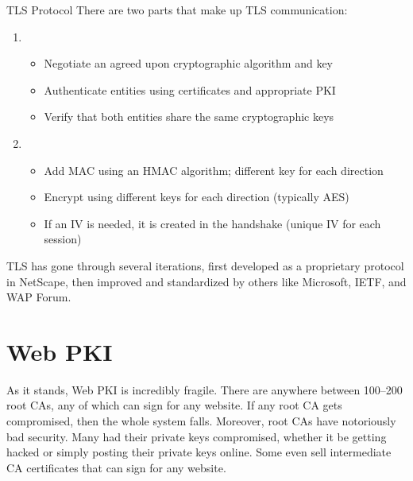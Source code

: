 \begin{tecbox}{TLS Protocol}{}
    There are two parts that make up TLS communication:
    \begin{enumerate}
        \item {}
        \begin{itemize}[noitemsep]
            \item Negotiate an agreed upon cryptographic algorithm and key
            \item Authenticate entities using certificates and appropriate PKI
            \item Verify that both entities share the same cryptographic keys
        \end{itemize}
        \item {}
        \begin{itemize}[noitemsep]
            \item Add MAC using an HMAC algorithm; different key for each direction
            \item Encrypt using different keys for each direction (typically AES)
            \item If an IV is needed, it is created in the handshake (unique IV for each session)
        \end{itemize}
    \end{enumerate}
\end{tecbox}

TLS has gone through several iterations, first developed as a proprietary protocol in NetScape, then improved and standardized by others like Microsoft, IETF, and WAP Forum.

\section{Web PKI}

As it stands, Web PKI is incredibly fragile. There are anywhere between 100--200 root CAs, any of which can sign for any website. If any root CA gets compromised, then the whole system falls. Moreover, root CAs have notoriously bad security. Many had their private keys compromised, whether it be getting hacked or simply posting their private keys online. Some even sell intermediate CA certificates that can sign for any website.


